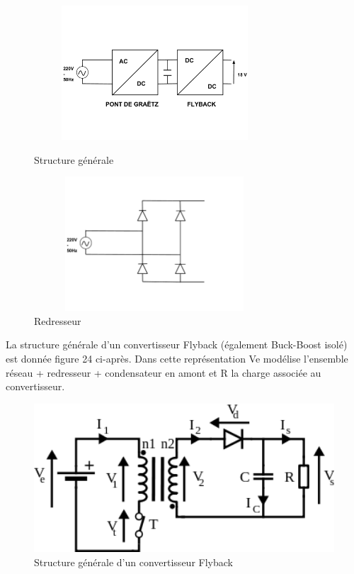\documentclass[12pt]{article}
\begin{document}
\begin{figure}[!h]
  \hspace{-30pt}
  \vspace{-30pt}
  \begin{minipage}[b]{0.45\linewidth}
   \centering
   \includegraphics[width=9cm,height=5cm,trim=0cm 3cm 0cm 4cm, clip=true]{Images_rapport/conversion}  
   \caption{Structure générale}   
  \end{minipage}
\hfill
  \begin{minipage}[b]{0.45\linewidth}
   \centering
   \includegraphics[width=9cm,height=5cm,trim=0cm 3cm 0cm 3.3cm, clip=true]{Images_rapport/redresseur}  
   \caption{Redresseur}   
  \end{minipage}
\end{figure}
\vspace{40pt}




La structure générale d'un convertisseur Flyback (également Buck-Boost isolé) est donnée figure 24 ci-après. Dans cette représentation Ve modélise l'ensemble {réseau + redresseur + condensateur} en amont et R la charge associée au convertisseur.

\begin{figure}[!h]
  \centering
  \includegraphics[width=12cm,trim=0cm 0cm 0cm 0cm, clip=true]{Images_Rapport/flyback}
  
  
  \caption{Structure générale d'un convertisseur Flyback}
  
\end{figure}
\end{document}
